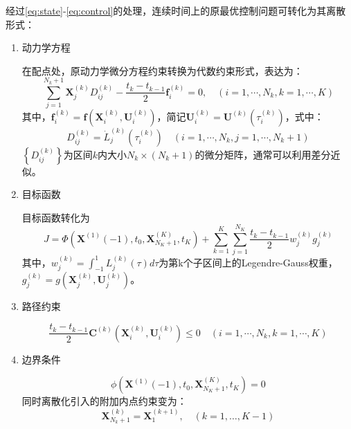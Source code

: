 经过\eqref{eq:state}-\eqref{eq:control}的处理，连续时间上的原最优控制问题可转化为其离散形式：
\begin{enumerate}
	\item 动力学方程\par
	      在配点处，原动力学微分方程约束转换为代数约束形式，表达为：
	      \begin{equation}
		      \sum_{j=1}^{N_{k}+1} \boldsymbol{X}_{j}^{(k)} D_{i j}^{(k)}-\frac{t_{k}-t_{k-1}}{2} \boldsymbol{f}_{i}^{(k)}=0, \quad\left(i=1, \cdots, N_{k}, k=1, \cdots, K\right)
	      \end{equation}
	      其中，$\boldsymbol{f}_{i}^{(k)}=\boldsymbol{f}\left(\boldsymbol{X}_{i}^{(k)}, \boldsymbol{U}_{i}^{(k)}\right)$，简记$ \boldsymbol{U}_{i}^{(k)}=\boldsymbol{U}^{(k)}\left(\tau_{i}^{(k)}\right)$，式中：
	      \begin{equation}
		      D_{i j}^{(k)}=\dot{L}_{j}^{(k)}\left(\tau_{i}^{(k)}\right) \quad\left(i=1, \cdots, N_{k}, j=1, \cdots, N_{k}+1\right)
	      \end{equation}
	      $ \left\{D_{i j}^{(k)}\right\} $为区间$ k $内大小$ N_k\times (N_k+1) $的微分矩阵，通常可以利用差分近似。
	\item 目标函数\par
	      目标函数转化为
	      \begin{equation}
		      J=\Phi\left(\boldsymbol{X}^{(1)}(-1), t_{0}, \boldsymbol{X}_{N_{K}+1}^{(K)}, t_{K}\right)+\sum_{k=1}^{K} \sum_{j=1}^{N_{K}} \frac{t_{k}-t_{k-1}}{2} w_{j}^{(k)} g_{j}^{(k)}
	      \end{equation}
	      其中，$w_{j}^{(k)}=\int_{-1}^{1} L_{j}^{(k)}(\tau) d \tau$为第k个子区间上的Legendre-Gauss权重，$g_{j}^{(k)}=g\left(\boldsymbol{X}_{j}^{(k)}, \boldsymbol{U}_{j}^{(k)}\right)$。
	\item 路径约束\par
	      \begin{equation}
		      \frac{t_{k}-t_{k-1}}{2} \boldsymbol{C}^{(k)}\left(\boldsymbol{X}_{i}^{(k)}, \boldsymbol{U}_{i}^{(k)}\right) \leq 0 \quad\left(i=1, \cdots, N_{k}, k=1, \cdots, K\right)
	      \end{equation}
	\item 边界条件\par
	      \begin{equation}\phi\left(\boldsymbol{X}^{(1)}(-1), t_{0}, \boldsymbol{X}_{N_{K}+1}^{(K)}, t_{K}\right)=0\end{equation}
	      同时离散化引入的附加内点约束变为：
	      \begin{equation}
		      \boldsymbol{X}_{N_{k}+1}^{(k)}=\boldsymbol{X}_{1}^{(k+1)}, \quad(k=1, \ldots, K-1)
	      \end{equation}
\end{enumerate}

